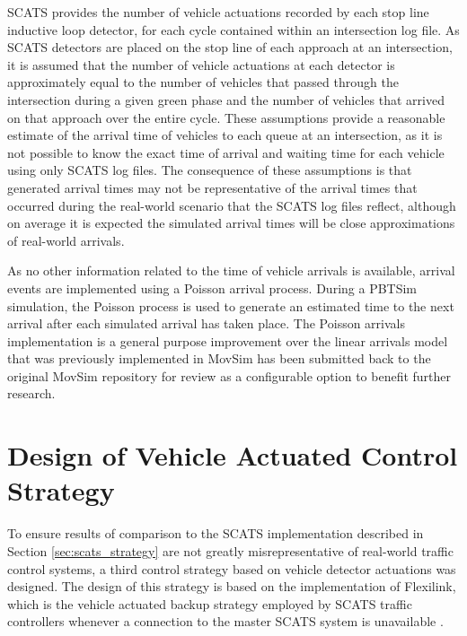 SCATS provides the number of vehicle actuations recorded by each stop line inductive loop detector, for each cycle contained within an intersection log file. As SCATS detectors are placed on the stop line of each approach at an intersection, it is assumed that the number of vehicle actuations at each detector is approximately equal to the number of vehicles that passed through the intersection during a given green phase and the number of vehicles that arrived on that approach over the entire cycle. These assumptions provide a reasonable estimate of the arrival time of vehicles to each queue at an intersection, as it is not possible to know the exact time of arrival and waiting time for each vehicle using only SCATS log files. The consequence of these assumptions is that generated arrival times may not be representative of the arrival times that occurred during the real-world scenario that the SCATS log files reflect, although on average it is expected the simulated arrival times will be close approximations of real-world arrivals. 

As no other information related to the time of vehicle arrivals is available, arrival events are implemented using a Poisson arrival process. During a PBTSim simulation, the Poisson process is used to generate an estimated time to the next arrival after each simulated arrival has taken place. The Poisson arrivals implementation is a general purpose improvement over the linear arrivals model that was previously implemented in MovSim has been submitted back to the original MovSim repository for review as a configurable option to benefit further research.

\section{Design of Vehicle Actuated Control Strategy}

To ensure results of comparison to the SCATS implementation described in Section \ref{sec:scats_strategy} are not greatly misrepresentative of real-world traffic control systems, a third control strategy based on vehicle detector actuations was designed. The design of this strategy is based on the implementation of Flexilink, which is the vehicle actuated backup strategy employed by SCATS traffic controllers whenever a connection to the master SCATS system is unavailable \cite{scatstraining}.


